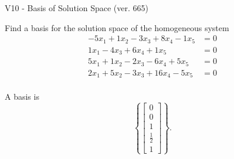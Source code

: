 \begin{exercise}
  \begin{exerciseTitle}V10 - Basis of Solution Space (ver. 665)\end{exerciseTitle}
  \begin{exerciseStatement}
    Find a basis for the solution space of the homogeneous system 
\begin{align*}
 -5 x_ 1 + 1 x_ 2 -3 x_ 3 + 8 x_ 4 -1 x_ 5 &= 0  \\ 
  1 x_ 1 -4 x_ 3 + 6 x_ 4 + 1 x_ 5 &= 0  \\ 
  5 x_ 1 + 1 x_ 2 -2 x_ 3 -6 x_ 4 + 5 x_ 5 &= 0  \\ 
  2 x_ 1 + 5 x_ 2 -3 x_ 3 + 16 x_ 4 -5 x_ 5 &= 0  \\ 
 \end{align*}


 
  \end{exerciseStatement}

  \begin{exerciseAnswer}
   A basis is   
\[\left\{\left[\begin{array}{c}
0 \\
0 \\
1 \\
\frac{1}{2} \\
1
\end{array}\right]\right\}.\]

  


  \end{exerciseAnswer}
\end{exercise}